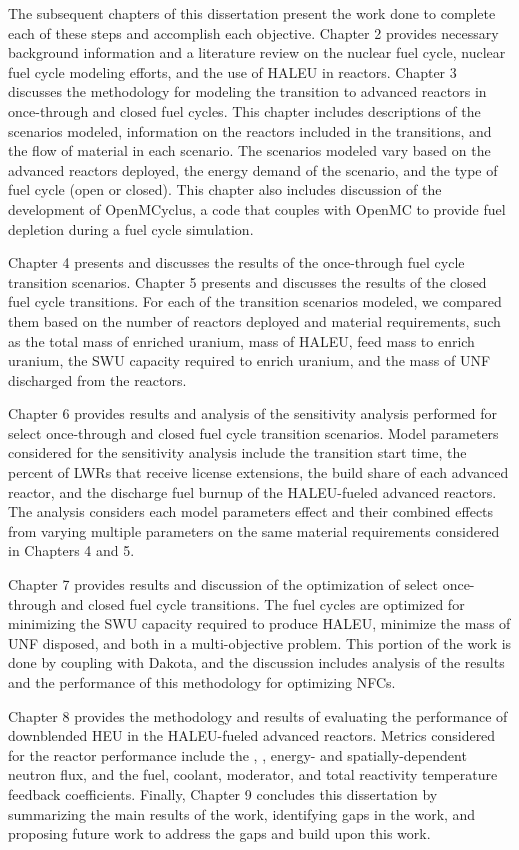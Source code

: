 The subsequent chapters of this dissertation present the work done to 
complete each of 
these steps and accomplish each objective. Chapter 2 
provides necessary 
background information and a literature review on the nuclear fuel cycle,
nuclear fuel cycle 
modeling efforts, and the use of \gls{HALEU} in reactors.
Chapter 3 discusses the methodology for modeling the transition to advanced 
reactors in once-through and closed fuel cycles. This chapter includes 
descriptions of
the scenarios modeled, information on the reactors included in the 
transitions, and the flow of 
material in each scenario. The scenarios modeled vary based on the 
advanced reactors deployed, the energy demand of the scenario, and the 
type of fuel cycle (open or closed). This chapter also includes discussion 
of the development of OpenMCyclus, a code that couples \Cyclus with OpenMC 
\cite{romano_openmc:_2015}
to provide fuel depletion during a fuel cycle simulation.

Chapter 4 presents and discusses the results of the 
once-through fuel cycle transition scenarios. Chapter 5 presents 
and discusses the 
results of the closed fuel cycle transitions. For each of the transition 
scenarios modeled, we compared them based on the number of reactors 
deployed and material requirements, such as the total mass of enriched 
uranium, mass of \gls{HALEU}, 
feed mass to enrich uranium, the \gls{SWU} capacity required to enrich 
uranium, and the mass of \gls{UNF} discharged from the reactors. 

Chapter 6 provides results 
and analysis of the sensitivity analysis performed for select once-through 
and closed fuel cycle transition scenarios. Model parameters considered 
for the sensitivity analysis include the transition start time, 
the percent of \glspl{LWR} that receive license extensions, the build share 
of each advanced reactor, and the discharge fuel burnup of the 
\gls{HALEU}-fueled advanced reactors. The analysis considers each model 
parameters effect and their combined effects from varying multiple 
parameters on the same material requirements considered in Chapters 4 and 5.

Chapter 7 provides 
results and discussion of the optimization of select once-through and 
closed fuel cycle transitions. The fuel cycles are optimized for minimizing 
the \gls{SWU} capacity required to produce \gls{HALEU}, minimize the 
mass of \gls{UNF} disposed, and both in a multi-objective problem. This 
portion of the work is done by coupling \Cyclus with Dakota, 
and the discussion includes analysis of the results 
and the performance of this methodology for optimizing \glspl{NFC}. 

Chapter 8 provides the methodology and 
results of evaluating the performance of downblended \gls{HEU} in 
the \gls{HALEU}-fueled advanced reactors. Metrics considered for the 
reactor performance include the \keff, \betaEff, energy- and 
spatially-dependent neutron flux, and the fuel, coolant, moderator, and
total reactivity temperature feedback coefficients. 
Finally, Chapter 9 concludes this dissertation by summarizing 
the main results of the work, identifying gaps in the work, and 
proposing future work to address the gaps and 
build upon this work. 
